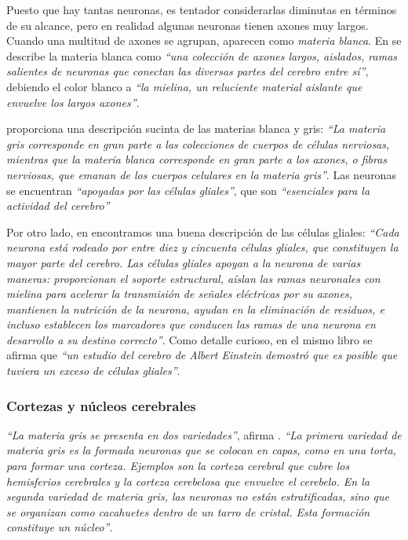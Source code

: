 Puesto que hay tantas neuronas, es tentador considerarlas diminutas en términos de su alcance, pero en realidad algunas neuronas tienen axones muy largos. Cuando una multitud de axones se agrupan, aparecen como {\it materia blanca}. En \cite{Czerner2001} se describe la materia blanca como {\it ``una colección de axones largos, aislados, ramas salientes de neuronas que conectan las diversas partes del cerebro entre sí''}, debiendo el color blanco a {\it ``la mielina, un reluciente material aislante que envuelve los largos axones''}.

\cite{Damasio1994} proporciona una descripción sucinta de las materias blanca y gris: {\it ``La materia gris corresponde en gran parte a las colecciones de cuerpos de células nerviosas, mientras que la materia blanca corresponde en gran parte a los axones, o fibras nerviosas, que emanan de los cuerpos celulares en la materia gris''}. Las neuronas se encuentran {\it ``apoyadas por las células gliales''}, que son {\it ``esenciales para la actividad del cerebro''}

Por otro lado, en \cite{Czerner2001} encontramos una buena descripción de las células gliales: {\it ``Cada neurona está rodeado por entre diez y cincuenta células gliales, que constituyen la mayor parte del cerebro. Las células gliales apoyan a la neurona de varias maneras: proporcionan el soporte estructural, aíslan las ramas neuronales con mielina para acelerar la transmisión de señales eléctricas por su axones, mantienen la nutrición de la neurona, ayudan en la eliminación de residuos, e incluso establecen los marcadores que conducen las ramas de una neurona en desarrollo a su destino correcto''}. Como detalle curioso, en el mismo libro se afirma que {\it ``un estudio del cerebro de Albert Einstein demostró que es posible que tuviera un exceso de células gliales''}.

\subsubsection{Cortezas y núcleos cerebrales}

{\it ``La materia gris se presenta en dos variedades''}, afirma \cite{Damasio1994}. {\it ``La primera variedad de materia gris es la formada neuronas que se colocan en capas, como en una torta, para formar una corteza. Ejemplos son la corteza cerebral que cubre los hemisferios cerebrales y la corteza cerebelosa que envuelve el cerebelo. En la segunda variedad de materia gris, las neuronas no están estratificadas, sino que se organizan como cacahuetes dentro de un tarro de cristal. Esta formación constituye un núcleo''}.

